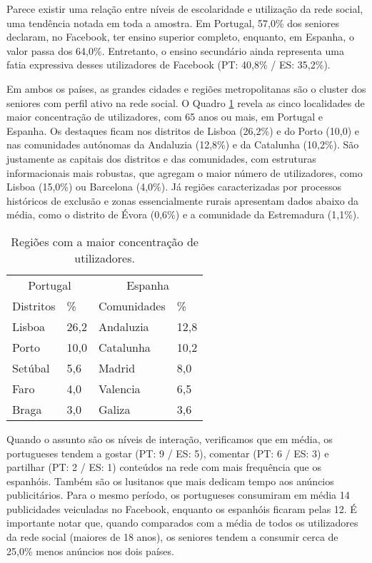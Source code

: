 \documentclass[portuguese]{textolivre}
\begin{document}
Parece existir uma relação entre níveis de escolaridade e utilização da rede social, uma tendência notada em toda a amostra. Em Portugal, 57,0\% dos seniores declaram, no Facebook, ter ensino superior completo, enquanto, em Espanha, o valor passa dos 64,0\%. Entretanto, o ensino secundário ainda representa uma fatia expressiva desses utilizadores de Facebook (PT: 40,8\% / ES: 35,2\%).

Em ambos os países, as grandes cidades e regiões metropolitanas são o cluster dos seniores com perfil ativo na rede social. O Quadro \ref{tab1} revela as cinco localidades de maior concentração de utilizadores, com 65 anos ou mais, em Portugal e Espanha. Os destaques ficam nos distritos de Lisboa (26,2\%) e do Porto (10,0) e nas comunidades autónomas da Andaluzia (12,8\%) e da Catalunha (10,2\%). São justamente as capitais dos distritos e das comunidades, com estruturas informacionais mais robustas, que agregam o maior número de utilizadores, como Lisboa (15,0\%) ou Barcelona (4,0\%). Já regiões caracterizadas por processos históricos de exclusão e zonas essencialmente rurais apresentam dados abaixo da média, como o distrito de Évora (0,6\%) e a comunidade da Estremadura (1,1\%).

\begin{table}[htpb]
\caption{Regiões com a maior concentração de utilizadores.}
\label{tab1}
\centering
\begin{tabular}{ll|ll}
\toprule 
\multicolumn{2}{c}{Portugal} & \multicolumn{2}{c}{Espanha}
\\
Distritos & \% & Comunidades & \%
\\
\midrule
Lisboa & 26,2 & 
Andaluzia & 12,8
\\
Porto & 10,0 &
Catalunha & 10,2
\\
Setúbal & 5,6 &
Madrid & 8,0
\\
Faro & 4,0 & 
Valencia & 6,5
\\
Braga & 3,0 & 
Galiza & 3,6
\\ 
\bottomrule
\end{tabular}
\end{table}

Quando o assunto são os níveis de interação, verificamos que em média, os portugueses tendem a gostar (PT: 9 / ES: 5), comentar (PT: 6 / ES: 3) e partilhar (PT: 2 / ES: 1) conteúdos na rede com mais frequência que os espanhóis. Também são os lusitanos que mais dedicam tempo aos anúncios publicitários. Para o mesmo período, os portugueses consumiram em média 14 publicidades veiculadas no Facebook, enquanto os espanhóis ficaram pelas 12. É importante notar que, quando comparados com a média de todos os utilizadores da rede social (maiores de 18 anos), os seniores tendem a consumir cerca de 25,0\% menos anúncios nos dois países.
\end{document}
